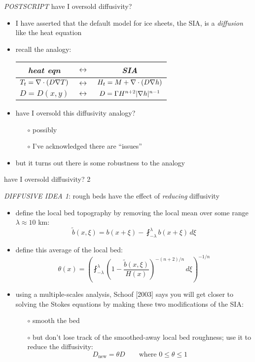 
\begin{frame}{\textsl{POSTSCRIPT}  have I oversold diffusivity?} 

\begin{itemize}
\item I have asserted that the default model for ice sheets, the SIA, is a \emph{diffusion} like the heat equation
\item recall the analogy:

\bigskip
\begin{tabular}{ccc}
\emph{heat eqn} & $\leftrightarrow$ & \emph{SIA} \\ \hline
$T_t = \nabla\cdot\left(D \nabla T\right)$ & $\leftrightarrow$ & $H_t = M + \nabla\cdot\left(D \nabla h\right)$ \\
$D=D(x,y)$ & $\leftrightarrow$ & $D = \Gamma H^{n+2} |\nabla h|^{n-1}$ \\
\end{tabular}

\bigskip
\item have I oversold this diffusivity analogy?
  \begin{itemize}
  \item[$\circ$] possibly
  \item[$\circ$] I've acknowledged there are ``issues''
  \end{itemize}
\item but it turns out there is some robustness to the analogy
\end{itemize}
\end{frame}


\begin{frame}{have I oversold diffusivity? 2}

\emph{DIFFUSIVE IDEA 1}: rough beds have the effect of \emph{reducing} diffusivity
\begin{itemize}
\item define the local bed topography by removing the local mean over some range $\lambda \approx 10$ km:
\small
   $$\tilde b(x,\xi) = b(x+\xi) - \fint_{-\lambda}^\lambda b(x+\xi)\,d\xi$$
\normalsize
\item define this average of the local bed:
\small
	$$\theta(x) = \left(\fint_{-\lambda}^\lambda \left(1 - \frac{\tilde b(x,\xi)}{H(x)}
                           \right)^{-(n+2)/n}\,d\xi\right)^{-1/n}$$
\normalsize
\item using a multiple-scales analysis, Schoof [2003] says you will get closer to solving the Stokes equations by making these two modifications of the SIA:
  \begin{itemize}
  \item[$\circ$] smooth the bed
  \item[$\circ$] but don't lose track of the smoothed-away local bed roughness; use it to reduce the diffusivity:
  \small
  		$$D_{\text{new}} = \theta D \qquad \text{where } 0 \le \theta \le 1$$
  \end{itemize}
\end{itemize}
\end{frame}


